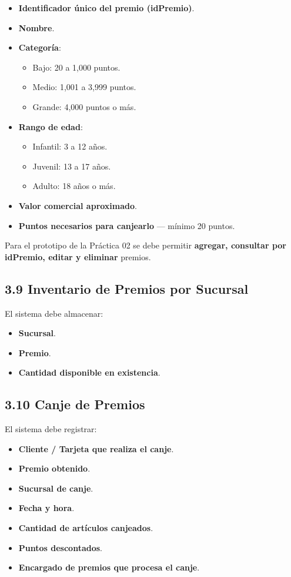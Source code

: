 \documentclass[12pt,a4paper]{article}
\begin{document}
\begin{itemize}
    \item \textbf{Identificador único del premio (idPremio)}.
    \item \textbf{Nombre}.
    \item \textbf{Categoría}:
    \begin{itemize}
        \item Bajo: 20 a 1,000 puntos.
        \item Medio: 1,001 a 3,999 puntos.
        \item Grande: 4,000 puntos o más.
    \end{itemize}
    \item \textbf{Rango de edad}:
    \begin{itemize}
        \item Infantil: 3 a 12 años.
        \item Juvenil: 13 a 17 años.
        \item Adulto: 18 años o más.
    \end{itemize}
    \item \textbf{Valor comercial aproximado}.
    \item \textbf{Puntos necesarios para canjearlo} --- mínimo 20 puntos.
\end{itemize}

Para el prototipo de la Práctica 02 se debe permitir \textbf{agregar, consultar por idPremio, editar y eliminar} premios.

\subsection*{3.9 Inventario de Premios por Sucursal}

El sistema debe almacenar:

\begin{itemize}
    \item \textbf{Sucursal}.
    \item \textbf{Premio}.
    \item \textbf{Cantidad disponible en existencia}.
\end{itemize}

\subsection*{3.10 Canje de Premios}

El sistema debe registrar:

\begin{itemize}
    \item \textbf{Cliente / Tarjeta que realiza el canje}.
    \item \textbf{Premio obtenido}.
    \item \textbf{Sucursal de canje}.
    \item \textbf{Fecha y hora}.
    \item \textbf{Cantidad de artículos canjeados}.
    \item \textbf{Puntos descontados}.
    \item \textbf{Encargado de premios que procesa el canje}.
\end{itemize}
\end{document}

